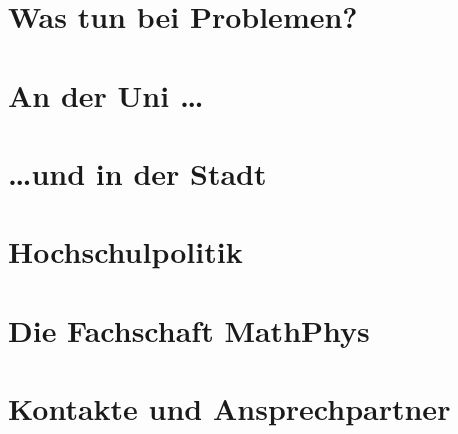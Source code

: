 \documentclass[ngerman,a4paper,openany,twocolumn,showtrims]{memoir}
\begin{document}
\chapter{Was tun bei Problemen?}






\chapter{An der Uni \dots}







\chapter{\dots und in der Stadt}





\chapter{Hochschulpolitik}




\chapter{Die Fachschaft MathPhys}
\label{diefsmathphys}







\chapter{Kontakte und Ansprechpartner}


\printglossaries
\end{document}
